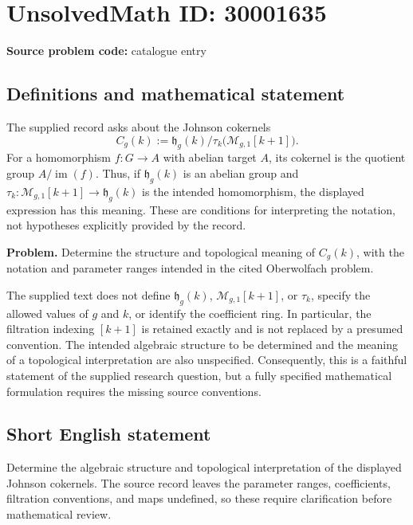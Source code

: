 \documentclass[11pt]{article}
\begin{document}
\section*{UnsolvedMath ID: 30001635}
\textbf{Source problem code:} catalogue entry
\subsection{Definitions and mathematical statement}
The supplied record asks about the Johnson cokernels
\[
C_g(k):=\mathfrak h_g(k)\big/\tau_k\bigl(\mathcal M_{g,1}[k+1]\bigr).
\]
For a homomorphism \(f:G\to A\) with abelian target \(A\), its cokernel is the quotient group \(A/\operatorname{im}(f)\). Thus, if \(\mathfrak h_g(k)\) is an abelian group and \(\tau_k:\mathcal M_{g,1}[k+1]\to\mathfrak h_g(k)\) is the intended homomorphism, the displayed expression has this meaning. These are conditions for interpreting the notation, not hypotheses explicitly provided by the record.

\textbf{Problem.} Determine the structure and topological meaning of \(C_g(k)\), with the notation and parameter ranges intended in the cited Oberwolfach problem.

The supplied text does not define \(\mathfrak h_g(k)\), \(\mathcal M_{g,1}[k+1]\), or \(\tau_k\), specify the allowed values of \(g\) and \(k\), or identify the coefficient ring. In particular, the filtration indexing \([k+1]\) is retained exactly and is not replaced by a presumed convention. The intended algebraic structure to be determined and the meaning of a topological interpretation are also unspecified. Consequently, this is a faithful statement of the supplied research question, but a fully specified mathematical formulation requires the missing source conventions.
\subsection{Short English statement}
Determine the algebraic structure and topological interpretation of the displayed Johnson cokernels. The source record leaves the parameter ranges, coefficients, filtration conventions, and maps undefined, so these require clarification before mathematical review.
\end{document}
